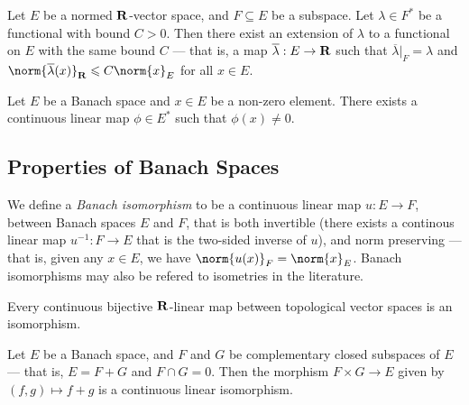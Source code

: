 \begin{theorem}
\label{thm:Hahn-Banach}
Let \(E\) be a normed \(\mathbf{R}\)-vector space, and \(F \subseteq E\) be a
subspace. Let \(\lambda \in F^{*}\) be a functional with bound \(C > 0\). Then
there exist an extension of \(\lambda\) to a functional on \(E\) with the same
bound \(C\) --- that is, a map \(\overline \lambda: E \to \mathbf{R}\) such that
\(\overline\lambda|_F = \lambda\) and \(\norm{\overline\lambda(x)}_\R \leq C
\norm{x}_{E}\) for all \(x \in E\).
\end{theorem}

\begin{corollary}
\label{cor:Hahn-Banach}
Let \(E\) be a Banach space and \(x \in E\) be a non-zero element. There exists
a continuous linear map \(\phi \in E^{*}\) such that \(\phi(x) \neq 0\).
\end{corollary}

\subsection{Properties of Banach Spaces}

\begin{definition}
\label{def:banach-isomorphism}
We define a \emph{Banach isomorphism} to be a continuous linear map \(u: E \to
F\), between Banach spaces \(E\) and \(F\), that is both invertible (there
exists a continous linear map \(u^{-1}: F \to E\) that is the two-sided inverse
of \(u\)), and norm preserving --- that is, given any \(x \in E\), we have
\(\norm{u(x)}_F = \norm{x}_E\). Banach isomorphisms may also be refered to
isometries in the literature.
\end{definition}

\begin{proposition}
\label{prop:continuous-bijective-linear-is-isomorphism}
Every continuous bijective \(\mathbf{R}\)-linear map between topological vector spaces
is an isomorphism.
\end{proposition}

\begin{proposition}[Splitting]
\label{prop:banach-split}
Let \(E\) be a Banach space, and \(F\) and \(G\) be complementary closed
subspaces of \(E\) --- that is, \(E = F + G\) and \(F \cap G = 0\). Then the
morphism \(F \times G \to E\) given by \((f, g) \mapsto f + g\) is a continuous
linear isomorphism.
\end{proposition}

